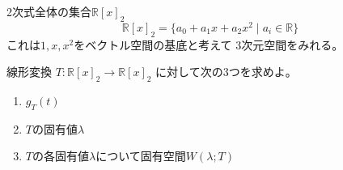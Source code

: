 \documentclass[12pt,b5paper]{ltjsarticle}
\begin{document}
\hrulefill

2次式全体の集合$\mathbb{R}[x]_{2}$
\begin{equation}
 \mathbb{R}[x]_{2}=
  \{ a_0+a_1x+a_2x^2 \mid a_{i}\in\mathbb{R} \}
\end{equation}
これは$1,x,x^2$をベクトル空間の基底と考えて
3次元空間をみれる。





\hrulefill

線形変換 $T : \mathbb{R}[x]_{2}\to\mathbb{R}[x]_{2}$
に対して次の3つを求めよ。
\begin{enumerate}
 \item
      $g_{T}(t)$
 \item
      $T$の固有値$\lambda$
 \item
      $T$の各固有値$\lambda$について固有空間$W(\lambda ; T)$
\end{enumerate}

\dotfill
\end{document}
